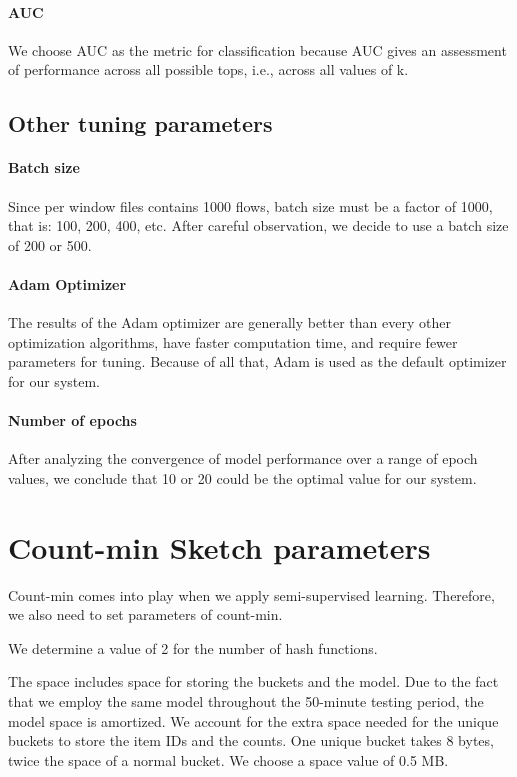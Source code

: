 \paragraph{AUC} 
We choose AUC as the metric for classification because AUC gives an assessment of performance across all possible tops, i.e., across all values of k.


\subsection{Other tuning parameters}
\paragraph{Batch size}
Since per window files contains 1000 flows, batch size must be a factor of 1000, that is: 100, 200, 400, etc. After careful observation, we decide to use a batch size of 200 or 500.

\paragraph{Adam Optimizer}
The results of the Adam optimizer are generally better than every other optimization algorithms, have faster computation time, and require fewer parameters for tuning. Because of all that, Adam is used as the default optimizer for our system.

\paragraph{Number of epochs}
After analyzing the convergence of model performance over a range of epoch values, we conclude that 10 or 20 could be the optimal value for our system. 

\section{Count-min Sketch parameters}
Count-min comes into play when we apply semi-supervised learning. Therefore, we also need to set parameters of count-min. 

We determine a value of 2 for the number of hash functions.

The space includes space for storing the buckets and the model. Due to the fact that we employ the same model throughout the 50-minute testing period, the model space is amortized. We account for the extra space needed for the unique buckets to store the item IDs and the counts. One unique bucket takes 8 bytes, twice the space of a normal bucket. We choose a space value of 0.5 MB.

